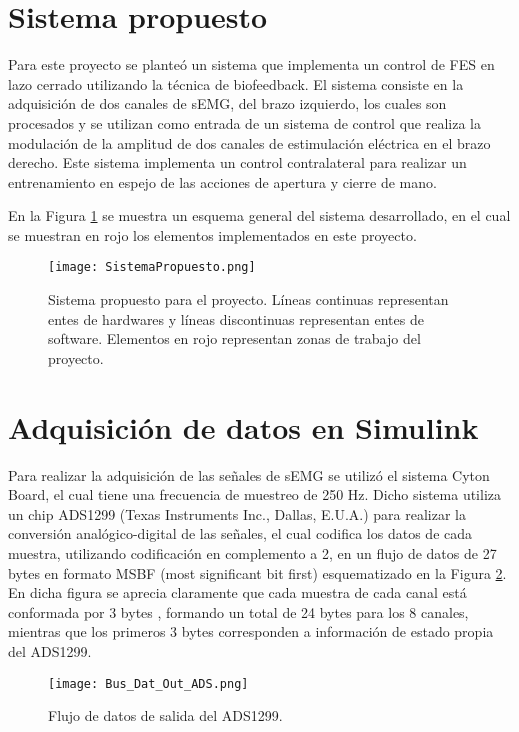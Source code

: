 \section{Sistema propuesto}
Para este proyecto se planteó un sistema que implementa un control de FES en lazo cerrado utilizando la técnica de biofeedback. El sistema consiste en la adquisición de dos canales de sEMG, del brazo izquierdo, los cuales son procesados y se utilizan como entrada de un sistema de control que realiza la modulación de la amplitud de dos canales de estimulación eléctrica en el brazo derecho. Este sistema implementa un control contralateral para realizar un entrenamiento en espejo de las acciones de apertura y cierre de mano.

En la Figura \ref{Figura: SistProp} se muestra un esquema general del sistema desarrollado, en el cual se muestran en rojo los elementos implementados en este proyecto.

\begin{figure}[htbp]
\centering
	\texttt{[image: SistemaPropuesto.png]}
	\caption[Sistema propuesto para el proyecto]{Sistema propuesto para el proyecto. Líneas continuas representan entes de hardwares y líneas discontinuas representan entes de software. Elementos en rojo representan zonas de trabajo del proyecto.}
	\label{Figura: SistProp}
\end{figure}


\section{Adquisición de datos en Simulink\textregistered} \label{Sec: Adquisicion}
Para realizar la adquisición de las señales de sEMG se utilizó el sistema Cyton Board, el cual tiene una frecuencia de muestreo de 250 Hz. Dicho sistema utiliza un chip ADS1299 (Texas Instruments Inc., Dallas, E.U.A.) para realizar la conversión analógico-digital de las señales, el cual codifica los datos de cada muestra, utilizando codificación en complemento a 2, en un flujo de datos de 27 bytes en formato MSBF (most significant bit first) esquematizado en la Figura \ref{Figura: BusOut}. En dicha figura se aprecia claramente que cada muestra de cada canal está conformada por 3 bytes , formando un total de 24 bytes para los 8 canales, mientras que los primeros 3 bytes corresponden a información de estado propia del ADS1299.

\begin{figure}[htbp]
\centering
	\texttt{[image: Bus\_Dat\_Out\_ADS.png]}
	\caption{Flujo de datos de salida del ADS1299.}
	\label{Figura: BusOut}
\end{figure}

